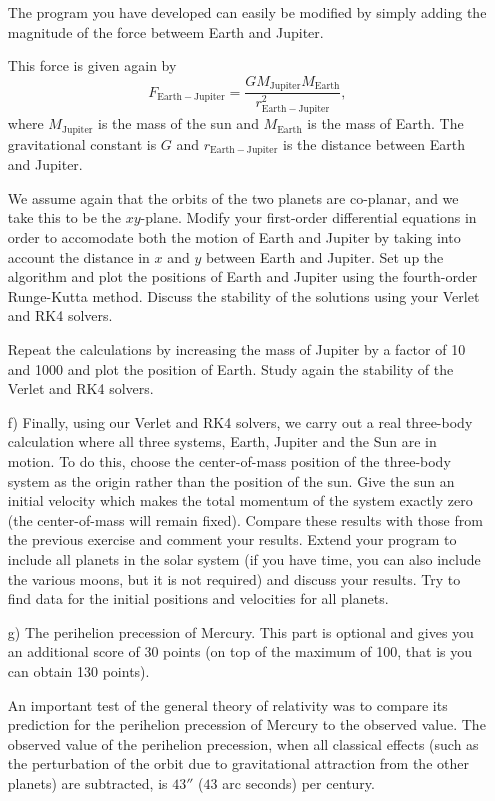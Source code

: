 \documentclass[11pt,a4wide]{article}
\begin{document}
\begin{enumerate}
The program you have developed can easily be modified by simply adding the magnitude of the force betweem Earth and Jupiter.

This force is given again by 
\[
F_{\mathrm{Earth-Jupiter}}=\frac{GM_{\mathrm{Jupiter}}M_{\mathrm{Earth}}}{r_{\mathrm{Earth-Jupiter}}^2},
\]
where $M_{\mathrm{Jupiter}}$ is the mass of the sun and $M_{\mathrm{Earth}}$ is the mass of Earth. 
The gravitational constant is $G$ and $r_{\mathrm{Earth-Jupiter}}$ is the distance between Earth and Jupiter.

We assume again that the orbits of the two planets are co-planar, and we take this to be the $xy$-plane. 
Modify your first-order differential equations in order to accomodate both the
motion of Earth and Jupiter by taking into account the distance in $x$ and
$y$ between Earth and Jupiter. Set up the algorithm and plot the positions of Earth and Jupiter using the fourth-order Runge-Kutta method.  
Discuss the stability of the solutions using your Verlet and RK4 solvers.

Repeat 
the calculations by increasing the mass of Jupiter by a factor of 10 and 1000
 and plot the position of Earth.  Study again the stability of the Verlet and RK4 solvers.

\item[f)] Finally, using our Verlet and RK4 solvers, we carry out a real three-body calculation where all three systems, 
Earth, Jupiter and the Sun are in motion. To do this, choose the center-of-mass position of the three-body system as 
the origin rather than the position of the sun. Give the sun an initial velocity which makes the total momentum of the system exactly zero (the center-of-mass will remain fixed). Compare these results with those from the previous exercise and comment your results. Extend your program to include all planets in the solar system (if you have time, you can also include the various moons, but it is not required) and discuss your results. Try to find data for the initial positions and velocities for all planets. 


\item[g)] The perihelion precession of Mercury. This part is optional and gives you an additional score of 30 points (on top of the maximum of 100, that is you can obtain 130 points).   

An important test of the general theory of relativity was to compare its prediction for the
perihelion precession of Mercury to the observed value. The observed value of the perihelion precession, when
all classical effects (such as the perturbation of the orbit due to gravitational attraction from the other planets) are
subtracted, is $43''$ ($43$ arc seconds) per century.


\end{enumerate}
\end{document}
